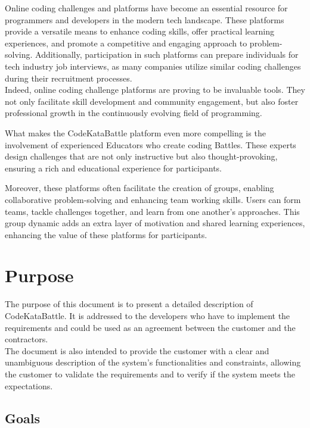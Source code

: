 Online coding challenges and platforms have become an essential resource for programmers and developers in the modern tech landscape. These platforms provide a versatile means to enhance coding skills, offer practical learning experiences, and promote a competitive and engaging approach to problem-solving. Additionally, participation in such platforms can prepare individuals for tech industry job interviews, as many companies utilize similar coding challenges during their recruitment processes.\\
Indeed, online coding challenge platforms are proving to be invaluable tools. They not only facilitate skill development and community engagement, but also foster professional growth in the continuously evolving field of programming.

What makes the CodeKataBattle platform even more compelling is the involvement of experienced Educators who create coding Battles. These experts design challenges that are not only instructive but also thought-provoking, ensuring a rich and educational experience for participants.

Moreover, these platforms often facilitate the creation of groups, enabling collaborative problem-solving and enhancing team working skills. Users can form teams, tackle challenges together, and learn from one another's approaches. This group dynamic adds an extra layer of motivation and shared learning experiences, enhancing the value of these platforms for participants.

\newpage

\section{Purpose}
\label{sec:purpose}%
The purpose of this document is to present a detailed description of CodeKataBattle.
It is addressed to the developers who have to implement the requirements and could be used as an agreement between the customer and the contractors.\\ 
The document is also intended to provide the customer with a clear and unambiguous description of the system's functionalities and constraints, allowing the customer to validate the requirements and to verify if the system meets the expectations.

\subsection{Goals}
\label{subsec:goals}%
\setcounter{g}{1}
\newcommand{\cg}{\theg\stepcounter{g}}

